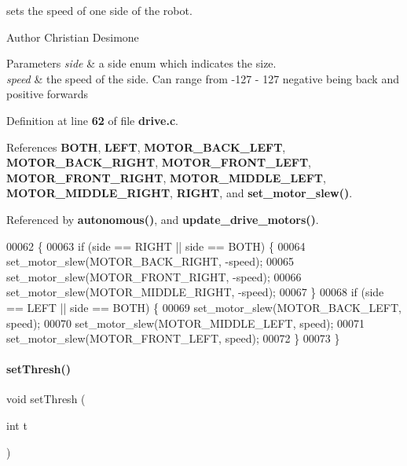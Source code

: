 sets the speed of one side of the robot. 

\begin{DoxyAuthor}{Author}
Christian Desimone 
\end{DoxyAuthor}

\begin{DoxyParams}{Parameters}
{\em side} & a side enum which indicates the size. \\
\hline
{\em speed} & the speed of the side. Can range from -\/127 -\/ 127 negative being back and positive forwards \\
\hline
\end{DoxyParams}


Definition at line \textbf{ 62} of file \textbf{ drive.\+c}.



References \textbf{ B\+O\+TH}, \textbf{ L\+E\+FT}, \textbf{ M\+O\+T\+O\+R\+\_\+\+B\+A\+C\+K\+\_\+\+L\+E\+FT}, \textbf{ M\+O\+T\+O\+R\+\_\+\+B\+A\+C\+K\+\_\+\+R\+I\+G\+HT}, \textbf{ M\+O\+T\+O\+R\+\_\+\+F\+R\+O\+N\+T\+\_\+\+L\+E\+FT}, \textbf{ M\+O\+T\+O\+R\+\_\+\+F\+R\+O\+N\+T\+\_\+\+R\+I\+G\+HT}, \textbf{ M\+O\+T\+O\+R\+\_\+\+M\+I\+D\+D\+L\+E\+\_\+\+L\+E\+FT}, \textbf{ M\+O\+T\+O\+R\+\_\+\+M\+I\+D\+D\+L\+E\+\_\+\+R\+I\+G\+HT}, \textbf{ R\+I\+G\+HT}, and \textbf{ set\+\_\+motor\+\_\+slew()}.



Referenced by \textbf{ autonomous()}, and \textbf{ update\+\_\+drive\+\_\+motors()}.


\begin{DoxyCode}
00062                                             \{
00063   \textcolor{keywordflow}{if} (side == RIGHT || side == BOTH) \{
00064     set_motor_slew(MOTOR_BACK_RIGHT, -speed);
00065     set_motor_slew(MOTOR_FRONT_RIGHT, -speed);
00066     set_motor_slew(MOTOR_MIDDLE_RIGHT, -speed);
00067   \}
00068   \textcolor{keywordflow}{if} (side == LEFT || side == BOTH) \{
00069     set_motor_slew(MOTOR_BACK_LEFT, speed);
00070     set_motor_slew(MOTOR_MIDDLE_LEFT, speed);
00071     set_motor_slew(MOTOR_FRONT_LEFT, speed);
00072   \}
00073 \}
\end{DoxyCode}
\mbox{\label{a00014_a53d6e35d53ec3e0b1b1c489d8203f204}} 
\paragraph{set\+Thresh()}
{\footnotesize\ttfamily void set\+Thresh (\begin{DoxyParamCaption}\item[{int}]{t }\end{DoxyParamCaption})}



